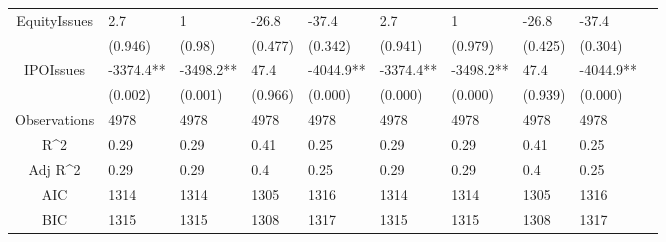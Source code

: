 \documentclass{article}
\begin{document}
\begin{table}[H]
\begin{tabular}{|clllllllll|}
  EquityIssues & 2.7 & 1 & -26.8 & -37.4 & 2.7 & 1 & -26.8 & -37.4 & \\ 
   & (0.946) & (0.98) & (0.477) & (0.342) & (0.941) & (0.979) & (0.425) & (0.304) & \\ 
  IPOIssues & -3374.4** & -3498.2** & 47.4 & -4044.9** & -3374.4** & -3498.2** & 47.4 & -4044.9** & \\ 
   & (0.002) & (0.001) & (0.966) & (0.000) & (0.000) & (0.000) & (0.939) & (0.000) & \\ 
  \hline 
 Observations & 4978 & 4978 & 4978 & 4978 & 4978 & 4978 & 4978 & 4978 & \\ 
  R^2 & 0.29 & 0.29 & 0.41 & 0.25 & 0.29 & 0.29 & 0.41 & 0.25 & \\ 
  Adj R^2 & 0.29 & 0.29 & 0.4 & 0.25 & 0.29 & 0.29 & 0.4 & 0.25 & \\ 
  AIC & 1314 & 1314 & 1305 & 1316 & 1314 & 1314 & 1305 & 1316 & \\ 
  BIC & 1315 & 1315 & 1308 & 1317 & 1315 & 1315 & 1308 & 1317 & \\ 
   \hline
\end{tabular}
 
\end{table}
\end{document}
